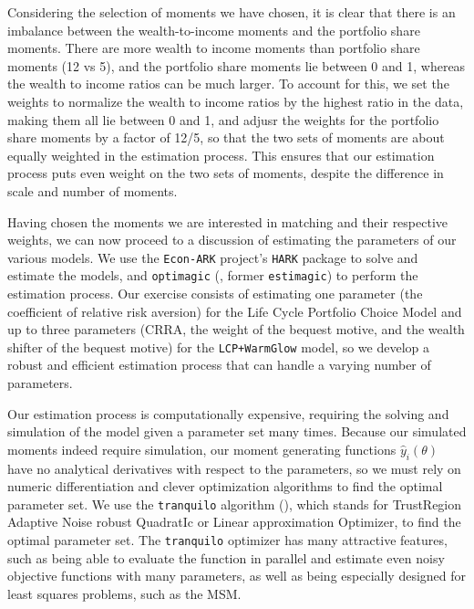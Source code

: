 \documentclass{article}
\begin{document}
Considering the selection of moments we have chosen, it is clear that there is an imbalance between the wealth-to-income moments and the portfolio share moments.
There are more wealth to income moments than portfolio share moments (12 vs 5), and the portfolio share moments lie between 0 and 1, whereas the wealth to income ratios can be much larger.
To account for this, we set the weights to normalize the wealth to income ratios by the highest ratio in the data, making them all lie between 0 and 1, and adjusr the weights for the portfolio share moments by a factor of 12/5, so that the two sets of moments are about equally weighted in the estimation process.
This ensures that our estimation process puts even weight on the two sets of moments, despite the difference in scale and number of moments.

Having chosen the moments we are interested in matching and their respective weights, we can now proceed to a discussion of estimating the parameters of our various models.
We use the \texttt{Econ-ARK} project's \texttt{HARK} package to solve and estimate the models, and \texttt{optimagic} (\cite{Gabler2022}, former \texttt{estimagic}) to perform the estimation process.
Our exercise consists of estimating one parameter (the coefficient of relative risk aversion) for the Life Cycle Portfolio Choice Model and up to three parameters (CRRA, the weight of the bequest motive, and the wealth shifter of the bequest motive) for the \texttt{LCP+WarmGlow} model, so we develop a robust and efficient estimation process that can handle a varying number of parameters. 

Our estimation process is computationally expensive, requiring the solving and simulation of the model given a parameter set many times.
Because our simulated moments indeed require simulation, our moment generating functions $\hat{y}_i(\theta)$ have no analytical derivatives with respect to the parameters, so we must rely on numeric differentiation and clever optimization algorithms to find the optimal parameter set.
We use the \texttt{tranquilo} algorithm (\cite{Gabler2024}), which stands for TrustRegion Adaptive Noise robust QuadratIc or Linear approximation Optimizer, to find the optimal parameter set.
The \texttt{tranquilo} optimizer has many attractive features, such as being able to evaluate the function in parallel and estimate even noisy objective functions with many parameters, as well as being especially designed for least squares problems, such as the MSM.
\end{document}
